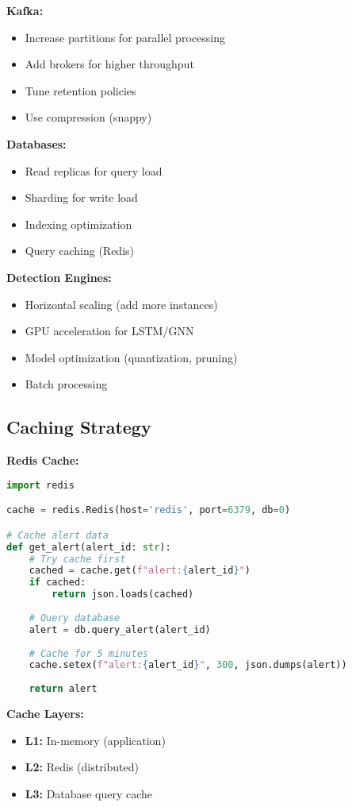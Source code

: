 \documentclass[12pt,a4paper]{article}
\begin{document}
\textbf{Kafka:}
\begin{itemize}[leftmargin=1cm,itemsep=0pt]
    \item Increase partitions for parallel processing
    \item Add brokers for higher throughput
    \item Tune retention policies
    \item Use compression (snappy)
\end{itemize}

\textbf{Databases:}
\begin{itemize}[leftmargin=1cm,itemsep=0pt]
    \item Read replicas for query load
    \item Sharding for write load
    \item Indexing optimization
    \item Query caching (Redis)
\end{itemize}

\textbf{Detection Engines:}
\begin{itemize}[leftmargin=1cm,itemsep=0pt]
    \item Horizontal scaling (add more instances)
    \item GPU acceleration for LSTM/GNN
    \item Model optimization (quantization, pruning)
    \item Batch processing
\end{itemize}

\subsection{Caching Strategy}

\textbf{Redis Cache:}
\begin{lstlisting}[language=python]
import redis

cache = redis.Redis(host='redis', port=6379, db=0)

# Cache alert data
def get_alert(alert_id: str):
    # Try cache first
    cached = cache.get(f"alert:{alert_id}")
    if cached:
        return json.loads(cached)
    
    # Query database
    alert = db.query_alert(alert_id)
    
    # Cache for 5 minutes
    cache.setex(f"alert:{alert_id}", 300, json.dumps(alert))
    
    return alert
\end{lstlisting}

\textbf{Cache Layers:}
\begin{itemize}[leftmargin=1cm,itemsep=0pt]
    \item \textbf{L1:} In-memory (application)
    \item \textbf{L2:} Redis (distributed)
    \item \textbf{L3:} Database query cache
\end{itemize}
\end{document}

